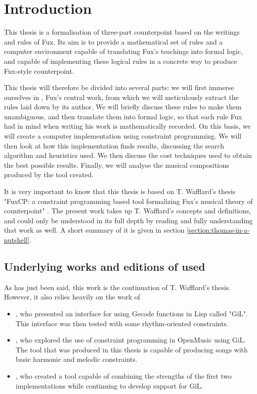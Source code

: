 \chapter{Introduction}
This thesis is a formalisation of three-part counterpoint based on the writings and rules of Fux. Its aim is to provide a mathematical set of rules and a computer environment capable of translating Fux's teachings into formal logic, and capable of implementing these logical rules in a concrete way to produce Fux-style counterpoint.


This thesis will therefore be divided into several parts: we will first immerse ourselves in \gap, Fux's central work, from which we will meticulously extract the rules laid down by its author. We will briefly discuss these rules to make them unambiguous, and then translate them into formal logic, so that each rule Fux had in mind when writing his work is mathematically recorded. On this basis, we will create a computer implementation using constraint programming. We will then look at how this implementation finds results, discussing the search algorithm and heuristics used. We then discuss the cost techniques used to obtain the best possible results. Finally, we will analyse the musical compositions produced by the tool created.

It is very important to know that this thesis is based on T. Wafflard's thesis "FuxCP: a constraint programming based tool formalizing Fux's musical theory of counterpoint" \cite{wafflard2023}. The present work takes up T. Wafflard's concepts and definitions, and could only be understood in its full depth by reading and fully understanding that work as well. A short summary of it is given in section \ref{section:thomas-in-a-nutshell}.


\section{Underlying works and editions of \gaps used}
As has just been said, this work is the continuation of T. Wafflard's thesis. However, it also relies heavily on the work of
\begin{itemize}
    \item \textcite{GiLthesis}, who presented an interface for using Gecode functions in Lisp called "GiL". This interface was then tested with some rhythm-oriented constraints.
    \item \textcite{Melothesis}, who explored the use of constraint programming in OpenMusic using GiL. The tool that was produced in this thesis is capable of producing songs with basic harmonic and melodic constraints.
    \item \textcite{Melo2thesis}, who created a tool capable of combining the strengths of the first two implementations while continuing to develop support for GiL.
\end{itemize}

